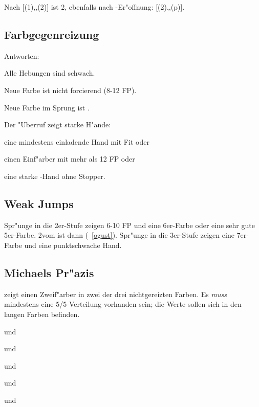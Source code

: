 Nach [(1\of){}\sep\kontra{}\sep(2\of)] ist 2\SA {},
ebenfalls
nach -Er"offnung: [(2\of){}\sep\kontra{}\sep(p)].

\subsection{Farbgegenreizung}

Antworten:
\begin{compactitem}
\item Alle Hebungen sind schwach.
\item Neue Farbe ist nicht forcierend (8-12 FP).
\item Neue Farbe im Sprung ist .
\item Der "Uberruf zeigt starke H"ande:
  \begin{compactitem}
  \item eine mindestens einladende Hand mit Fit oder
  \item einen Einf"arber mit mehr als 12 FP oder
  \item eine starke \sa-Hand ohne Stopper.
  \end{compactitem}
\end{compactitem}

\subsection{Weak Jumps}

Spr"unge in die 2er-Stufe zeigen 6-10 FP und eine 6er-Farbe oder eine sehr gute
5er-Farbe. 2\SA vom \eo ist dann  (\ra~\ref{ogust}).
Spr"unge in die 3er-Stufe zeigen eine 7\pl{}er-Farbe und eine punktschwache
Hand.

\subsection{Michaels Pr"azis}

 zeigt einen Zweif"arber in zwei der drei
nichtgereizten Farben.  Es \emph{muss} mindestens eine 5/5-Verteilung
vorhanden sein; die Werte sollen sich in den langen Farben befinden.
%
\bdsc
\item[(1\uf){}\sep2\kar] \co und \pi
\item[(1\uf){}\sep2\SA] \co und \aufa {}
\item[(1\of){}\sep2\of] \aofa und \tr
\item[(1\of){}\sep2\SA] \tr und \ka {}
\item[(1\of){}\sep3\tre] \aofa und \ka
\edsc

